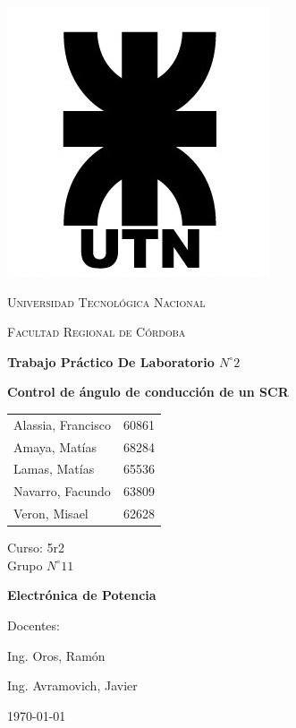 \documentclass{article}
\begin{document}
\begin{titlepage}
 \centering
	\includegraphics[scale=0.80]{imagenes/LOGO.jpg} \par
 	\vspace{1cm}
 	{\scshape\LARGE Universidad Tecnológica Nacional \par}
 	{\scshape\large Facultad Regional de Córdoba \par}
 	\vspace{1cm}
	{\bfseries \Large Trabajo Práctico De Laboratorio $N^{\circ} 2$\par}
	{\bfseries \Large Control de ángulo de conducción de un SCR \par}
 	\vspace{1.5cm}

	\begin{tabular}{ll}
		Alassia, Francisco	&	60861	\\
		Amaya, Matías		&	68284	\\
		Lamas, Matías 		&	65536 	\\
		Navarro, Facundo 	&	63809 	\\
		Veron, Misael	 	&	62628
	\end{tabular}
	
	\vspace{1cm}
	Curso: 5r2 \\
	Grupo $N^{\circ} 11$
 	\vfill
	{\bfseries \Large Electrónica de Potencia \par}

	\vspace{1.5cm}
	Docentes: \par
	Ing. Oros, Ramón \par
	Ing. Avramovich, Javier \par

 	\vfill
	{\large \today\par}
\end{titlepage}
\end{document}
